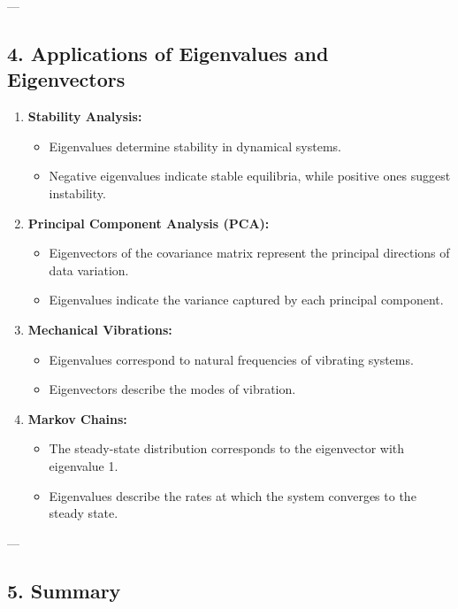 \documentclass[11pt]{article}
\begin{document}
---

\subsection*{4. Applications of Eigenvalues and Eigenvectors}

\begin{enumerate}
    \item \textbf{Stability Analysis:}
    \begin{itemize}
        \item Eigenvalues determine stability in dynamical systems.
        \item Negative eigenvalues indicate stable equilibria, while positive ones suggest instability.
    \end{itemize}
    
    \item \textbf{Principal Component Analysis (PCA):}
    \begin{itemize}
        \item Eigenvectors of the covariance matrix represent the principal directions of data variation.
        \item Eigenvalues indicate the variance captured by each principal component.
    \end{itemize}
    
    \item \textbf{Mechanical Vibrations:}
    \begin{itemize}
        \item Eigenvalues correspond to natural frequencies of vibrating systems.
        \item Eigenvectors describe the modes of vibration.
    \end{itemize}
    
    \item \textbf{Markov Chains:}
    \begin{itemize}
        \item The steady-state distribution corresponds to the eigenvector with eigenvalue 1.
        \item Eigenvalues describe the rates at which the system converges to the steady state.
    \end{itemize}
\end{enumerate}


---

\subsection*{5. Summary}
\end{document}
